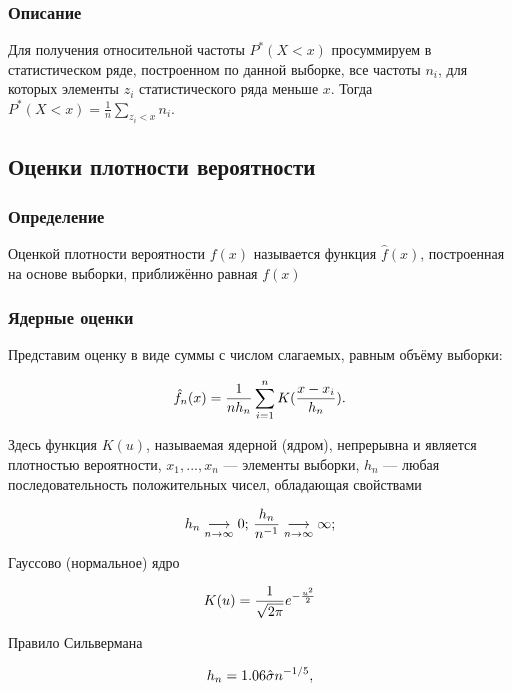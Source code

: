 \documentclass[12pt,a4paper]{scrartcl}
\begin{document}
\subsubsection{Описание}

Для получения относительной частоты $P^*(X < x)$ просуммируем в статистическом ряде, построенном по данной выборке, все частоты $n_i$, для которых элементы $z_i$ статистического ряда меньше $x$. Тогда $P^*(X < x) = \frac{1}{n}\sum_{z_i < x} n_i.$

\subsection{Оценки плотности вероятности}
\subsubsection{Определение}

Оценкой плотности вероятности $f(x)$ называется функция $\hat{f}(x)$, построенная на основе выборки, приближённо равная $f(x)$

\subsubsection{Ядерные оценки}

Представим оценку в виде суммы с числом слагаемых, равным объёму выборки:

\begin{equation}\label{eq:KernelEstimate}
\centering
\hat{f}_n(x) = \frac{1}{nh_n}\sum_{i=1}^n K(\frac{x-x_i}{h_n}).
\end{equation}

Здесь функция $K(u)$, называемая ядерной (ядром), непрерывна и является
плотностью вероятности, $x_1, ... , x_n$ — элементы выборки, {$h_n$} — любая
последовательность положительных чисел, обладающая свойствами

\begin{equation}
\centering
h_n \underset{n \to \infty}{\longrightarrow} 0;  \, \frac{h_n}{n^{-1}} \underset{n \to \infty}{\longrightarrow} \infty;
\end{equation}

Гауссово (нормальное) ядро

\begin{equation}
\centering
K(u) = \frac{1}{\sqrt{2\pi} } e^{-\frac{u^2}2}
\end{equation}

Правило Сильвермана

\begin{equation}
\centering
h_n = 1.06\hat{\sigma}n^{-1/5},
\end{equation}
\end{document}
